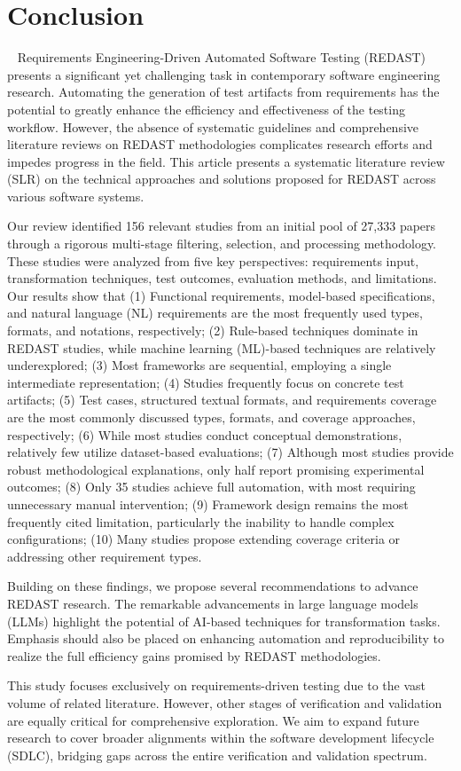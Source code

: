 \section{Conclusion}~\label{sec:Conclusion}
Requirements Engineering-Driven Automated Software Testing (REDAST) presents a significant yet challenging task in contemporary software engineering research. Automating the generation of test artifacts from requirements has the potential to greatly enhance the efficiency and effectiveness of the testing workflow. However, the absence of systematic guidelines and comprehensive literature reviews on REDAST methodologies complicates research efforts and impedes progress in the field. This article presents a systematic literature review (SLR) on the technical approaches and solutions proposed for REDAST across various software systems.

Our review identified 156 relevant studies from an initial pool of 27,333 papers through a rigorous multi-stage filtering, selection, and processing methodology. These studies were analyzed from five key perspectives: requirements input, transformation techniques, test outcomes, evaluation methods, and limitations. Our results show that (1) Functional requirements, model-based specifications, and natural language (NL) requirements are the most frequently used types, formats, and notations, respectively; (2) Rule-based techniques dominate in REDAST studies, while machine learning (ML)-based techniques are relatively underexplored; (3) Most frameworks are sequential, employing a single intermediate representation; (4) Studies frequently focus on concrete test artifacts; (5) Test cases, structured textual formats, and requirements coverage are the most commonly discussed types, formats, and coverage approaches, respectively; (6) While most studies conduct conceptual demonstrations, relatively few utilize dataset-based evaluations; (7) Although most studies provide robust methodological explanations, only half report promising experimental outcomes; (8) Only 35 studies achieve full automation, with most requiring unnecessary manual intervention; (9) Framework design remains the most frequently cited limitation, particularly the inability to handle complex configurations; (10) Many studies propose extending coverage criteria or addressing other requirement types.

Building on these findings, we propose several recommendations to advance REDAST research. The remarkable advancements in large language models (LLMs) highlight the potential of AI-based techniques for transformation tasks. Emphasis should also be placed on enhancing automation and reproducibility to realize the full efficiency gains promised by REDAST methodologies.

This study focuses exclusively on requirements-driven testing due to the vast volume of related literature. However, other stages of verification and validation are equally critical for comprehensive exploration. We aim to expand future research to cover broader alignments within the software development lifecycle (SDLC), bridging gaps across the entire verification and validation spectrum.